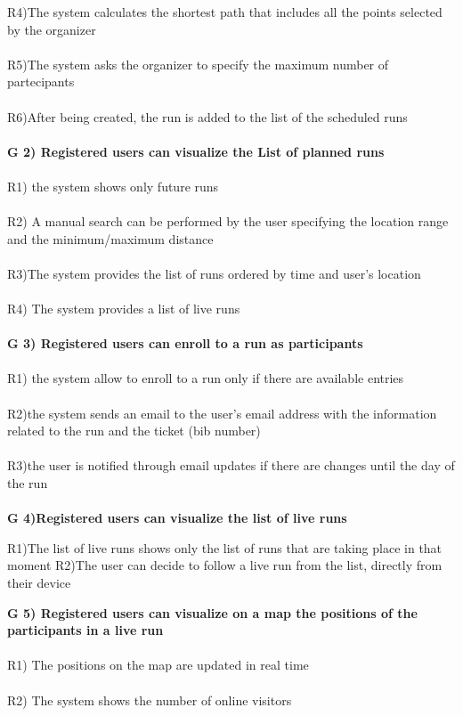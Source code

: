 R4)The system calculates the shortest path that includes all the points selected by the organizer \\ \\   

R5)The system asks the organizer to specify the maximum number of partecipants \\ \\

R6)After being created, the run is added to the list of the scheduled runs \\ \\
\textbf{G 2) Registered users can visualize the List of planned runs} \\ \\
R1) the system shows only future runs \\ \\ 

R2) A manual search can be performed by the user specifying the location range and the minimum/maximum distance \\ \\ 
R3)The system provides the list of runs ordered by time and user’s location \\ \\
R4) The system provides a list of live runs \\ \\
\textbf{G 3) Registered users can enroll to a run as participants} \\ \\
R1) the system allow to enroll to a run only if there are available entries \\ \\
R2)the system sends an email to the user’s email address with the information related to the run and the ticket (bib number) \\ \\
R3)the user is notified through email updates if there are changes until the day of the run \\ \\
\textbf{G 4)Registered users can visualize the list of live runs}

R1)The list of live runs shows only the list of runs that are taking place in that moment
R2)The user can decide to follow a live run from the list, directly from their device

\textbf{G 5) Registered users can visualize on a map the positions of the participants in a live run} \\ \\	
R1) The positions on the map are updated in real time \\ \\
R2) The system shows the number of online visitors \\


